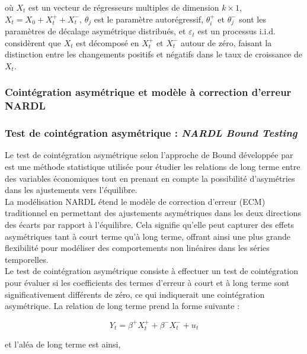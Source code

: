 \begin{sloppypar}
où \( X_t \) est un vecteur de régresseurs multiples de dimension \( k \times 1 \), \( X_t = X_0 + X_t^+ + X_t^- \), \( \theta_j \) est le paramètre autorégressif, \( \theta_{i}^+ \) et \( \theta_{j}^- \) sont les paramètres de décalage asymétrique distribués, et \( \varepsilon_t \) est un processus i.i.d. \cite{Shin} considèrent que \( X_t \) est décomposé en \( X_t^+ \) et \( X_t^- \) autour de zéro, faisant la distinction entre les changements positifs et négatifs dans le taux de croissance de \( X_t \).

\subsubsection{Cointégration asymétrique et modèle à correction d'erreur NARDL}

\subsubsection*{Test de cointégration asymétrique : \textit{NARDL Bound Testing}}

Le test de cointégration asymétrique selon l'approche de Bound développée par \cite{Pesaran et Shin} est une méthode statistique utilisée pour étudier les relations de long terme entre des variables économiques tout en prenant en compte la possibilité d'asymétries dans les ajustements vers l'équilibre.\\

La modélisation NARDL étend le modèle de correction d'erreur (ECM) traditionnel en permettant des ajustements asymétriques dans les deux directions des écarts par rapport à l'équilibre. Cela signifie qu'elle peut capturer des effets asymétriques tant à court terme qu'à long terme, offrant ainsi une plus grande flexibilité pour modéliser des comportements non linéaires dans les séries temporelles.\\

Le test de cointégration asymétrique consiste à effectuer un test de cointégration pour évaluer si les coefficients des termes d'erreur à court et à long terme sont significativement différents de zéro, ce qui indiquerait une cointégration asymétrique. La relation de long terme prend la forme suivante :

\begin{equation}
   Y_t = \beta^+ X_t^+ + \beta^- X_t^- + u_t  
\end{equation}

et l'aléa de long terme est ainsi, 


\end{sloppypar}
